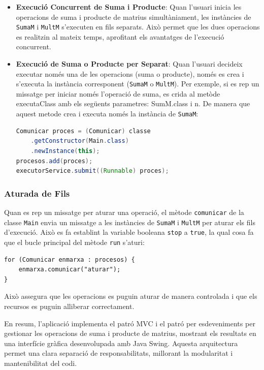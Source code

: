 \documentclass{ieeetj}
\begin{document}
\begin{itemize}
    \item \textbf{Execució Concurrent de Suma i Producte}: Quan l'usuari inicia les operacions de suma i producte de matrius simultàniament, les instàncies de \texttt{SumaM} i \texttt{MultM} s'executen en fils separats. Això permet que les dues operacions es realitzin al mateix temps, aprofitant els avantatges de l'execució concurrent.
    \item \textbf{Execució de Suma o Producte per Separat}: Quan l'usuari decideix executar només una de les operacions (suma o producte), només es crea i s'executa la instància corresponent (\texttt{SumaM} o \texttt{MultM}). Per exemple, si es rep un missatge per iniciar només l'operació de suma, es crida al metòde executaClass amb els següents parametres: SumM.class i n. De manera que aquest metode  crea i executa només la instància de \texttt{SumaM}:

\begin{lstlisting}[language=Java, basicstyle=\ttfamily\footnotesize]
Comunicar proces = (Comunicar) classe
    .getConstructor(Main.class)
    .newInstance(this);
procesos.add(proces);
executorService.submit((Runnable) proces);
\end{lstlisting}

\end{itemize}

\subsubsection{Aturada de Fils}
Quan es rep un missatge per aturar una operació, el mètode \texttt{comunicar} de la classe \texttt{Main} envia un missatge a les instàncies de \texttt{SumaM} i \texttt{MultM} per aturar els fils d'execució. Això es fa establint la variable booleana \texttt{stop} a \texttt{true}, la qual cosa fa que el bucle principal del mètode \texttt{run} s'aturi:

\begin{verbatim}
for (Comunicar enmarxa : procesos) {
    enmarxa.comunicar("aturar");
}
\end{verbatim}

Això assegura que les operacions es puguin aturar de manera controlada i que els recursos es puguin alliberar correctament.

En resum, l'aplicació implementa el patró MVC i el patró per esdeveniments per gestionar les operacions de suma i producte de matrius, mostrant els resultats en una interfície gràfica desenvolupada amb Java Swing. Aquesta arquitectura permet una clara separació de responsabilitats, millorant la modularitat i mantenibilitat del codi.
\end{document}
